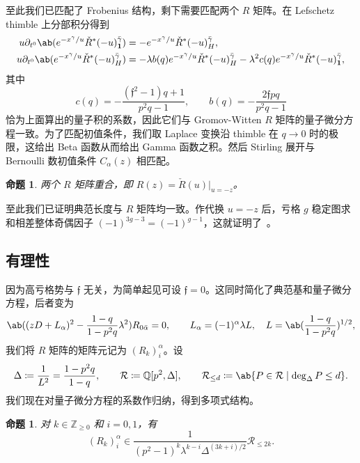 \documentclass{amsart}
\newtheorem{prop}[thm]{命题}
\theoremstyle{definition}
\theoremstyle{remark}
\theoremstyle{plain}
\theoremstyle{definition}
\theoremstyle{remark}
\newcommand{\Z}{\mathbb{Z}}
\newcommand{\Q}{\mathbb{Q}}
\newcommand{\mc}[1]{\mathcal{#1}}
\newcommand{\mf}[1]{\mathfrak{#1}}
\newcommand{\1}{\mathbf{1}}
\newcommand{\2}{\mathbf{2}}
\newcommand{\3}{\mathbf{3}}
\begin{document}
至此我们已匹配了 Frobenius 结构，剩下需要匹配两个 \(R\) 矩阵。在 Lefschetz thimble 上分部积分得到
\begin{align*}
    u \partial_{t^0}\ab(e^{-x^{\gamma}/u}\check{R}^*(-u)^{\bar{\gamma}}_{\1}) &= -e^{-x^{\gamma}/u}\check{R}^*(-u)^{\bar{\gamma}}_H, \\
    u\partial_{t^0}\ab(e^{-x^{\gamma}/u}\check{R}^*(-u)^{\bar{\gamma}}_H) &= -\lambda b(q)e^{-x^{\gamma}/u}\check{R}^*(-u)^{\bar{\gamma}}_H - \lambda^2 c(q) e^{-x^{\gamma}/u}\check{R}^*(-u)^{\bar{\gamma}}_{\1},
\end{align*}
其中
\[ c(q) = -\frac{(\mf{f}^2-1)q+1}{p^2q-1}, \qquad b(q) = -\frac{2\mf{f}pq}{p^2q-1} \]
恰为上面算出的量子积的系数，因此它们与 Gromov-Witten \(R\) 矩阵的量子微分方程一致。为了匹配初值条件，我们取 Laplace 变换沿 thimble 在 \(q \to 0\) 时的极限，这给出 Beta 函数从而给出 Gamma 函数之积。然后 Stirling 展开与 Bernoulli 数初值条件 \(C_{\alpha}(z)\) 相匹配。

\begin{prop}%
\label{prop:R matrices coincide}
    两个 \(R\) 矩阵重合，即 \(R(z) = \check{R}(u)|_{u=-z}\)。
\end{prop}

至此我们已证明典范长度与 \(R\) 矩阵均一致。作代换 \(u = -z\) 后，亏格 \(g\) 稳定图求和相差整体奇偶因子 \((-1)^{3g-3} = (-1)^{g-1}\)，这就证明了~。

\subsection{有理性}%
\label{sub:Rationality}

因为高亏格势与 \(\mf{f}\) 无关，为简单起见可设 \(\mf{f} = 0\)。这同时简化了典范基和量子微分方程，后者变为
\[ \ab((zD+L_{\alpha})^2 - \frac{1-q}{1-p^2q}\lambda^2)R_{0\bar{\alpha}} = 0, \qquad L_{\alpha} = (-1)^{\alpha}\lambda L, \quad L = \ab(\frac{1-q}{1-p^2q})^{1/2}, \]
我们将 \(R\) 矩阵的矩阵元记为 \((R_k)_i^{\alpha}\)。设
\[ \Delta \coloneqq \frac{1}{L^2} = \frac{1-p^2q}{1-q}, \qquad \mc{R} \coloneqq \Q[p^2,\Delta], \qquad \mc{R}_{\leq d} \coloneqq \ab\{P \in \mc{R} \mid \deg_{\Delta} P \leq d\}. \]
我们现在对量子微分方程的系数作归纳，得到多项式结构。

\begin{prop}%
\label{prop:R matrix polynomiality}
    对 \(k \in \Z_{\geq0}\) 和 \(i = 0,1\)，有
    \[ (R_k)_i^{\alpha} \in \frac{1}{(p^2-1)^k \lambda^{k-i}\Delta^{(3k+i)/2}}\mc{R}_{\leq 2k}. \]
\end{prop}
\end{document}
